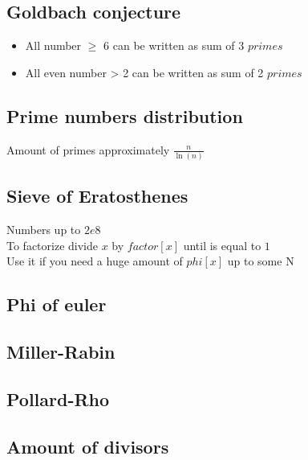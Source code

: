
\subsection{Goldbach conjecture}
\vspace{-5pt}
\begin{itemize}[noitemsep]
  \item All number $\geq$ 6 can be written as sum of 3 $primes$
  \item All even number > 2 can be written as sum of 2 $primes$
\end{itemize}
\vspace{-15pt}

\subsection{Prime numbers distribution}
Amount of primes approximately $\frac{n}{\ln(n)}$

\subsection{Sieve of Eratosthenes}
Numbers up to $2e8$ \\
To factorize divide $x$ by $factor[x]$ until is equal to $1$ \\
Use it if you need a huge amount of $phi[x]$ up to some N \\
\vspace{-15pt}

\subsection{Phi of euler}

\subsection{Miller-Rabin}

\subsection{Pollard-Rho}

\subsection{Amount of divisors}

